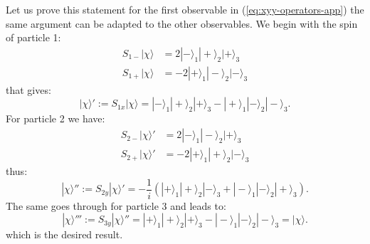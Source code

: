 Let us prove this statement for the first observable in (\ref{eq:xyy-operators-app}) the same argument can be adapted to the other observables. We begin with the spin of particle 1:
\begin{equation*}
  \begin{split}
    S_{1-} |\chi\rangle &= 2 |-\rangle_1 |+\rangle_2 |+\rangle_3\\
    S_{1+} |\chi\rangle &= - 2 |+\rangle_1 |-\rangle_2 |-\rangle_3
  \end{split}
\end{equation*}
that gives:
\begin{equation*}
  |\chi\rangle' := S_{1x} |\chi\rangle = |-\rangle_1 |+\rangle_2 |+\rangle_3 - |+\rangle_1 |-\rangle_2 |-\rangle_3.
\end{equation*}
For particle 2 we have:
\begin{equation*}
  \begin{split}
    S_{2-} |\chi\rangle' &= 2 |-\rangle_1 |-\rangle_2 |+\rangle_3\\
    S_{2+} |\chi\rangle' &= - 2 |+\rangle_1 |+\rangle_2 |-\rangle_3
  \end{split}
\end{equation*}
thus:
\begin{equation*}
  |\chi\rangle'' := S_{2y} |\chi\rangle' = - \frac{1}{i} \left( |+\rangle_1 |+\rangle_2 |-\rangle_3 + |-\rangle_1 |-\rangle_2 |+\rangle_3 \right).
\end{equation*}
The same goes through for particle 3 and leads to:
\begin{equation*}
  |\chi\rangle''' := S_{3y} |\chi\rangle'' = |+\rangle_1 |+\rangle_2 |+\rangle_3 - |-\rangle_1 |-\rangle_2 |-\rangle_3 = |\chi\rangle.
\end{equation*}
which is the desired result.
